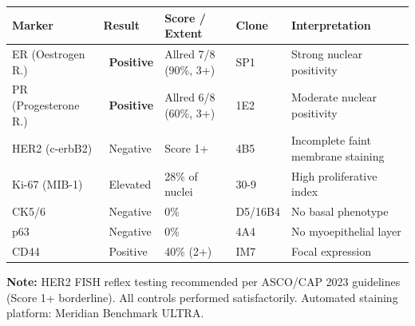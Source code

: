 \documentclass[11pt,a4paper]{article}
\newcommand{\posmarker}{\textcolor{PathGreen}{\faCheckCircle}}
\newcommand{\negmarker}{\textcolor{PathMidGray}{\faTimesCircle}}
\newcommand{\critmarker}{\textcolor{PathRed}{\faExclamationCircle}}
\begin{document}
\begin{tcolorbox}[goldbox, title={\faTable\quad Immunohistochemistry Results}]

\renewcommand{\arraystretch}{1.35}
\begin{tabularx}{\linewidth}{L{2.6cm} C{1.8cm} C{2.2cm} C{1.6cm} X}
  \toprule
  \textbf{Marker} & \textbf{Result} & \textbf{Score / Extent} & \textbf{Clone} & \textbf{Interpretation} \\
  \midrule
  ER (Oestrogen R.) & \posmarker\ \textbf{Positive} & Allred 7/8 (90\%{}, 3+) & SP1 & Strong nuclear positivity \\
  PR (Progesterone R.) & \posmarker\ \textbf{Positive} & Allred 6/8 (60\%{}, 3+) & 1E2 & Moderate nuclear positivity \\
  HER2 (c-erbB2) & \negmarker\ Negative & Score 1+ & 4B5 & Incomplete faint membrane staining \\
  Ki-67 (MIB-1) & \critmarker\ Elevated & 28\%{} of nuclei & 30-9 & High proliferative index \\
  CK5/6 & \negmarker\ Negative & 0\%{} & D5/16B4 & No basal phenotype \\
  p63 & \negmarker\ Negative & 0\%{} & 4A4 & No myoepithelial layer \\
  CD44 & \posmarker\ Positive & 40\%{} (2+) & IM7 & Focal expression \\
  \bottomrule
\end{tabularx}

\vspace{4pt}
{\footnotesize\color{PathMidGray}%
\textbf{Note:} HER2 FISH reflex testing recommended per ASCO/CAP 2023 guidelines (Score 1+ borderline).
All controls performed satisfactorily. Automated staining platform: Meridian Benchmark ULTRA.}
\end{tcolorbox}

\newpage
\end{document}
